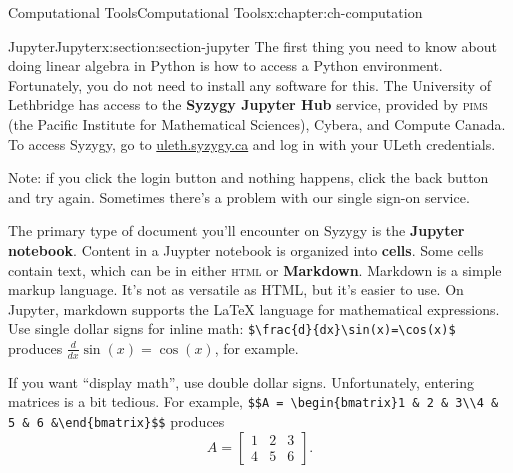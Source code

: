 \documentclass[oneside,10pt,]{book}
\newcommand{\mono}[1]{\texttt{#1}}
\newcommand{\initialism}[1]{\textsc{\MakeLowercase{#1}}}
\newcommand{\terminology}[1]{\textbf{#1}}
\numberwithin{equation}{section}
\newcommand{\amp}{&}
\begin{document}
\setcounter{tocdepth}{1}
\renewcommand*\contentsname{Contents}
\tableofcontents
\mainmatter
%
%
\typeout{************************************************}
\typeout{************************************************}
%
\begin{chapterptx}{Computational Tools}{}{Computational Tools}{}{}{x:chapter:ch-computation}
%
%
\typeout{************************************************}
\typeout{************************************************}
%
\begin{sectionptx}{Jupyter}{}{Jupyter}{}{}{x:section:section-jupyter}
The first thing you need to know about doing linear algebra in Python is how to access a Python environment. Fortunately, you do not need to install any software for this. The University of Lethbridge has access to the \terminology{Syzygy Jupyter Hub} service, provided by \initialism{PIMS} (the Pacific Institute for Mathematical Sciences), Cybera, and Compute Canada. To access Syzygy, go to \href{https://uleth.syzygy.ca}{uleth.syzygy.ca} and log in with your ULeth credentials.%
\par
Note: if you click the login button and nothing happens, click the back button and try again. Sometimes there's a problem with our single sign-on service.%
\par
The primary type of document you'll encounter on Syzygy is the \terminology{Jupyter notebook}. Content in a Juypter notebook is organized into \terminology{cells}. Some cells contain text, which can be in either \initialism{HTML} or \terminology{Markdown}. Markdown is a simple markup language. It's not as versatile as HTML, but it's easier to use. On Jupyter, markdown supports the LaTeX language for mathematical expressions. Use single dollar signs for inline math: \mono{\$\textbackslash{}frac\{d\}\{dx\}\textbackslash{}sin(x)=\textbackslash{}cos(x)\$} produces \(\frac{d}{dx}\sin(x)=\cos(x)\), for example.%
\par
If you want ``display math'', use double dollar signs. Unfortunately, entering matrices is a bit tedious. For example, \mono{\$\$A = \textbackslash{}begin\{bmatrix\}1 \& 2 \& 3\textbackslash{}\textbackslash{}4 \& 5 \& 6 \&\textbackslash{}end\{bmatrix\}\$\$} produces%
\begin{equation*}
A = \begin{bmatrix}1\amp 2\amp 3\\4\amp 5\amp 6\end{bmatrix}\text{.}

\end{equation*}
\end{sectionptx}
\end{chapterptx}
\end{document}
